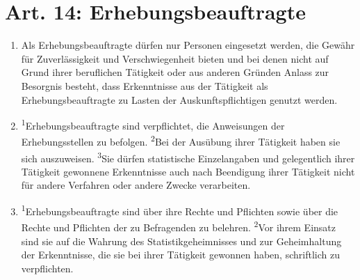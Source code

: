 \documentclass[A4, 12pt]{scrbook}
\begin{document}
    \section{Art. 14: Erhebungsbeauftragte}
        \begin{enumerate}[label=(\arabic*)]
            \item Als Erhebungsbeauftragte dürfen nur Personen eingesetzt werden, die Gewähr für Zuverlässigkeit und Verschwiegenheit bieten und bei denen nicht auf Grund ihrer beruflichen Tätigkeit oder aus anderen Gründen Anlass zur Besorgnis besteht, dass Erkenntnisse aus der Tätigkeit als Erhebungsbeauftragte zu Lasten der Auskunftspflichtigen genutzt werden.
            \item \textsuperscript{1}Erhebungsbeauftragte sind verpflichtet, die Anweisungen der Erhebungsstellen zu befolgen. \textsuperscript{2}Bei der Ausübung ihrer Tätigkeit haben sie sich auszuweisen. \textsuperscript{3}Sie dürfen statistische Einzelangaben und gelegentlich ihrer Tätigkeit gewonnene Erkenntnisse auch nach Beendigung ihrer Tätigkeit nicht für andere Verfahren oder andere Zwecke verarbeiten.
            \item \textsuperscript{1}Erhebungsbeauftragte sind über ihre Rechte und Pflichten sowie über die Rechte und Pflichten der zu Befragenden zu belehren. \textsuperscript{2}Vor ihrem Einsatz sind sie auf die Wahrung des Statistikgeheimnisses und zur Geheimhaltung der Erkenntnisse, die sie bei ihrer Tätigkeit gewonnen haben, schriftlich zu verpflichten.
        \end{enumerate}
\end{document}
